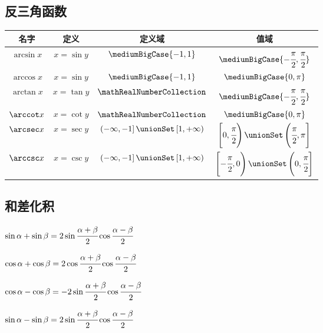 {\subsection{反三角函数}{
  \begin{tabular}{|c|c|c|c|}
    \hline
    名字        & 定义         & 定义域                                                     & 值域                                                                      \\
    \hline
    $\arcsin x$ & $x = \sin y$ & $\mediumBigCase{-1,1}$                                     & $\mediumBigCase{-\cfrac{\pi}{2},\cfrac{\pi}{2}}$                          \\
    \hline
    $\arccos x$ & $x = \sin y$ & $\mediumBigCase{-1,1}$                                     & $\mediumBigCase{0,\pi}$                                                   \\
    \hline
    $\arctan x$ & $x = \tan y$ & $\mathRealNumberCollection$                                & $\mediumBigCase{-\cfrac{\pi}{2},\cfrac{\pi}{2}}$                          \\
    \hline
    $\arccot x$ & $x = \cot y$ & $\mathRealNumberCollection$                                & $\mediumBigCase{0,\pi}$                                                   \\
    \hline
    $\arcsec x$ & $x = \sec y$ & $\left(-\infty,-1\right] \unionSet \left[1,+\infty\right)$ & $\left[0,\cfrac{\pi}{2}\right) \unionSet \left(\cfrac{\pi}{2},\pi\right]$ \\
    \hline
    $\arccsc x$ & $x = \csc y$ & $\left(-\infty,-1\right] \unionSet \left[1,+\infty\right)$ & $\left[-\cfrac{\pi}{2},0\right) \unionSet \left(0,\cfrac{\pi}{2}\right]$  \\
    \hline
  \end{tabular}
}%

\subsection{和差化积}{
  $\sin{\alpha}+\sin{\beta} = 2\sin{\cfrac{\alpha + \beta}{2}}\cos{\cfrac{\alpha - \beta}{2}}$

  $\cos{\alpha}+\cos{\beta} = 2\cos{\cfrac{\alpha + \beta}{2}\cos{\cfrac{\alpha-\beta}{2}}}$

  $\cos{\alpha}-\cos{\beta} = -2\sin{\cfrac{\alpha + \beta}{2}}\cos{\cfrac{\alpha - \beta}{2}}$

  $\sin{\alpha}-\sin{\beta} = 2\sin{\cfrac{\alpha + \beta}{2}}\cos{\cfrac{\alpha - \beta}{2}}$

}}
